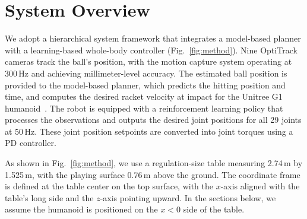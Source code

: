 \section{System Overview}
We adopt a hierarchical system framework that integrates a model-based planner with a learning-based whole-body controller (Fig.~\ref{fig:method}).
Nine OptiTrack cameras track the ball’s position, with the motion capture system operating at 300\,Hz and achieving millimeter-level accuracy.
The estimated ball position is provided to the model-based planner, which predicts the hitting position and time, and computes the desired racket velocity at impact for the Unitree G1 humanoid~\cite{unitree_g1}.
The robot is equipped with a reinforcement learning policy that processes the observations and outputs the desired joint positions for all 29 joints at 50\,Hz.
These joint position setpoints are converted into joint torques using a PD controller.

As shown in Fig.~\ref{fig:method}, we use a regulation-size table measuring 2.74\,m by 1.525\,m, with the playing surface 0.76\,m above the ground. The coordinate frame is defined at the table center on the top surface, with the $x$-axis aligned with the table’s long side and the $z$-axis pointing upward. In the sections below, we assume the humanoid is positioned on the $x<0$ side of the table.
